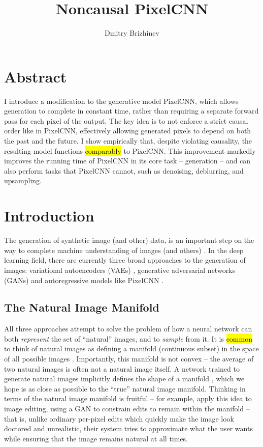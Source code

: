 \documentclass[10pt,a4paper]{article}
\newcommand{\nquote}[1]{``{#1}''}
\begin{document}
\title{\vspace{-10ex}Noncausal PixelCNN}
\author{Dmitry Brizhinev}
\maketitle

\section*{Abstract}
I introduce a modification to the generative model PixelCNN, which allows generation to complete in constant time, rather than requiring a separate forward pass for each pixel of the output. The key idea is to not enforce a strict causal order like in PixelCNN, effectively allowing generated pixels to depend on both the past and the future. I show empirically that, despite violating causality, the resulting model functions \hl{comparably} to PixelCNN. This improvement markedly improves the running time of PixelCNN in its core task -- generation -- and can also perform tasks that PixelCNN cannot, such as denoising, deblurring, and upsampling.

\tableofcontents

\section{Introduction}

The generation of synthetic image (and other) data, is an important step on the way to complete machine understanding of images (and others) \cite{??}. In the deep learning field, there are currently three broad approaches to the generation of images: variational autoencoders (VAEs) \cite{vae}, generative adversarial networks (GANs) \cite{gan} and autoregressive models like PixelCNN \cite{pixelcnn2}.

\subsection{The Natural Image Manifold}

All three approaches attempt to solve the problem of how a neural network can both \emph{represent} the set of \nquote{natural} images, and to \emph{sample} from it. It is \hl{common} to think of natural images as defining a manifold (continuous subset) in the space of all possible images \cite{manifoldmanipulation}. Importantly, this manifold is not convex -- the average of two natural images is often not a natural image itself. A network trained to generate natural images implicitly defines the shape of a manifold \cite{manifoldmanipulation}, which we hope is as close as possible to the \nquote{true} natural image manifold. Thinking in terms of the natural image manifold is fruitful -- for example, \cite{manifoldmanipulation} apply this idea to image editing, using a GAN to constrain edits to remain within the manifold -- that is, unlike ordinary per-pixel edits which quickly make the image look doctored and unrealistic, their system tries to approximate what the user wants while ensuring that the image remains natural at all times.
\end{document}
